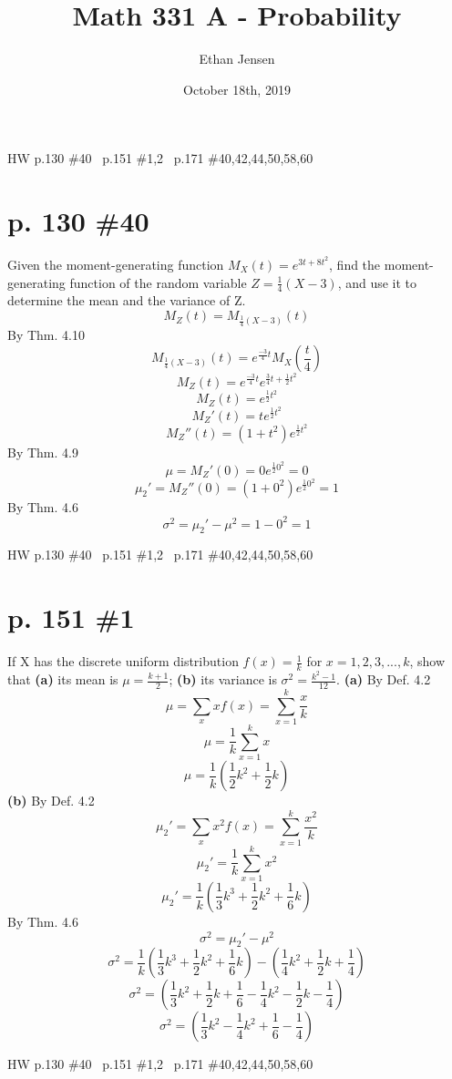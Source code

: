 \documentclass[12pt]{article}
\title{Math 331 A - Probability}
\author{Ethan Jensen}
\date{October 18th, 2019}
\begin{document}
	
	\maketitle HW p.130 \#40 \ p.151 \#1,2 \ p.171 \#40,42,44,50,58,60
	\section[20pt]{p. 130 \#40}
	Given the moment-generating function \(M_X(t) = e^{3t+8t^2}\), find the moment-generating function of the random variable \(Z=\frac{1}{4}(X-3)\), and use it to determine the mean and the variance of Z.
	\newline
	\newline
	\[M_Z(t)=M_{\frac{1}{4}(X-3)}(t)\]
	By Thm. 4.10
	\[M_{\frac{1}{4}(X-3)}(t)=e^{\frac{-3}{4}t}M_X\left(\frac{t}{4}\right)\]
	\[M_Z(t)=e^{\frac{-3}{4}t}e^{\frac{3}{4}t+\frac{1}{2}t^2}\]
	\[M_Z(t)=e^{\frac{1}{2}t^2}\]
	\[M_Z'(t)=te^{\frac{1}{2}t^2}\]
	\[M_Z''(t)=(1+t^2)e^{\frac{1}{2}t^2}\]
	By Thm. 4.9
	\[\mu=M_Z'(0)=0e^{\frac{1}{2}0^2}=0\]
	\[\mu_2'=M_Z''(0)=(1+0^2)e^{\frac{1}{2}0^2}=1\]
	By Thm. 4.6
	\[\sigma^2=\mu_2'-\mu^2=1-0^2=1\]
	\newpage
	\maketitle HW p.130 \#40 \ p.151 \#1,2 \ p.171 \#40,42,44,50,58,60
	\section[20pt]{p. 151 \#1}
	If X has the discrete uniform distribution \(f(x)=\frac{1}{k}\) for \(x=1,2,3,...,k\), show that
	\newline
	\textbf{(a)} its mean is \(\mu=\frac{k+1}{2}\);
	\newline
	\textbf{(b)} its variance is \(\sigma^2=\frac{k^2-1}{12}\).
	\newline
	\newline
	\textbf{(a)} By Def. 4.2
	\[\mu=\sum_xxf(x)=\sum_{x=1}^k\frac{x}{k}\]
	\[\mu=\frac{1}{k}\sum_{x=1}^kx\]
	\[\mu=\frac{1}{k}\left(\frac{1}{2}k^2+\frac{1}{2}k\right)\]
	\newline
	\newline
	\textbf{(b)} By Def. 4.2
	\[\mu_2'=\sum_xx^2f(x)=\sum_{x=1}^k\frac{x^2}{k}\]
	\[\mu_2'=\frac{1}{k}\sum_{x=1}^kx^2\]
	\[\mu_2'=\frac{1}{k}\left(\frac{1}{3}k^3+\frac{1}{2}k^2+\frac{1}{6}k\right)\]
	By Thm. 4.6
	\[\sigma^2=\mu_2'-\mu^2\]
	\[\sigma^2=\frac{1}{k}\left(\frac{1}{3}k^3+\frac{1}{2}k^2+\frac{1}{6}k\right)-\left(\frac{1}{4}k^2+\frac{1}{2}k+\frac{1}{4}\right)\]
	\[\sigma^2=\left(\frac{1}{3}k^2+\frac{1}{2}k+\frac{1}{6}-\frac{1}{4}k^2-\frac{1}{2}k-\frac{1}{4}\right)\]
	\[\sigma^2=\left(\frac{1}{3}k^2-\frac{1}{4}k^2+\frac{1}{6}-\frac{1}{4}\right)\]
	\newpage
	\maketitle HW p.130 \#40 \ p.151 \#1,2 \ p.171 \#40,42,44,50,58,60
\end{document}
